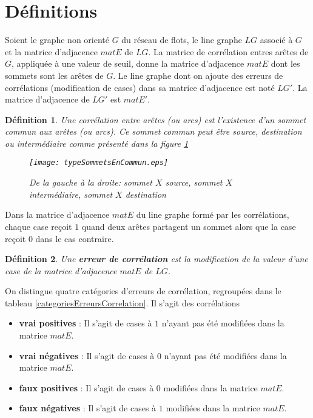 \documentclass[onecolumn, 12pt]{book}
\newtheorem{definition}{D\'efinition}
\begin{document}
\section{D\'efinitions}
Soient le graphe non orient\'e $G$ du r\'eseau de flots, le line graphe $LG$ associ\'e \`a $G$ et la matrice d'adjacence $matE$ de $LG$. La matrice de corr\'elation entres ar\^etes de $G$, appliqu\'ee \`a une valeur de seuil, donne la matrice d'adjacence $matE$ dont les sommets sont les ar\^etes de $G$. \newline
Le line graphe dont on ajoute des erreurs de corr\'elations (modification de cases) dans sa matrice d'adjacence est not\'e $LG'$. La matrice d'adjacence de $LG'$ est $matE'$. 

\begin{definition}
Une corr\'elation entre ar\^etes (ou arcs) est l'existence d'un sommet commun aux ar\^etes (ou arcs). 
Ce sommet commun peut \^etre source, destination ou interm\'ediaire comme pr\'esent\'e dans la figure \ref{typeSommetEnCommun}
\begin{centering} 
\begin{figure}[htb!] 
\texttt{[image: typeSommetsEnCommun.eps]}
\caption{De la gauche \`a la droite: sommet $X$ source, sommet $X$ interm\'ediaire, sommet $X$ destination}
\label{typeSommetEnCommun} 
\end{figure}
\end{centering} 
\end{definition}
Dans la matrice d'adjacence $matE$ du line graphe form\'e par les corr\'elations, chaque case re\c coit $1$ quand deux ar\^etes partagent un sommet alors que la case re\c coit $0$ dans le cas contraire.

\begin{definition}
Une {\bf erreur de corr\'elation} est la modification de la valeur d'une case de la matrice d'adjacence $matE$ de $LG$.
\end{definition}
On distingue quatre cat\'egories d'erreurs de corr\'elation, regroup\'ees dans le tableau \ref{categoriesErreursCorrelation}. Il s'agit des corr\'elations 
\begin{itemize}
\item {\bf vrai positives} : Il s'agit de cases \`a $1$ n'ayant pas \'et\'e modifi\'ees dans la matrice $matE$.
\item {\bf vrai n\'egatives} :  Il s'agit de cases \`a $0$ n'ayant pas \'et\'e modifi\'ees dans la matrice $matE$.
\item {\bf faux positives} : Il s'agit de cases \`a $0$ modifi\'ees dans la matrice $matE$.
\item {\bf faux n\'egatives} : Il s'agit de cases \`a $1$ modifi\'ees dans la matrice $matE$.
\end{itemize}
\end{document}
